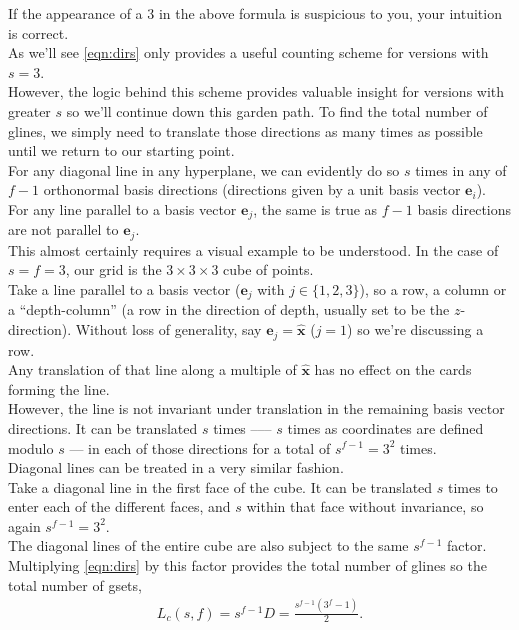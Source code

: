 \documentclass{article}
\theoremstyle{definition}
\theoremstyle{remark}
\begin{document}
If the appearance of a 3 in the above formula is suspicious to you, your intuition is correct.\\
As we'll see \autoref{eqn:dirs} only provides a useful counting scheme for versions with $s=3$.\\
However, the logic behind this scheme provides valuable insight for versions with greater $s$ so we'll continue down this garden path.\smallbreak
To find the total number of glines, we simply need to translate those directions as many times as possible until we return to our starting point.\\
For any diagonal line in any hyperplane, we can evidently do so $s$ times in any of $f-1$ orthonormal basis directions (directions given by a unit basis vector $\mathbf{e}_i$).\\
For any line parallel to a basis vector $\mathbf{e}_j$, the same is true as $f-1$ basis directions are not parallel to $\mathbf{e}_j$.\\
This almost certainly requires a visual example to be understood.\smallbreak
In the case of $s=f=3$, our grid is the $3\times3\times3$ cube of points.\\
Take a line parallel to a basis vector ($\mathbf{e}_j$ with $j\in\{1,2,3\}$), so a row, a column or a ``depth-column'' (a row in the direction of depth, usually set to be the $z$-direction). Without loss of generality, say $\mathbf{e}_j=\hat{\mathbf{x}}$ ($j=1$) so we're discussing a row.\\
Any translation of that line along a multiple of $\hat{\mathbf{x}}$ has no effect on the cards forming the line.\\
However, the line is not invariant under translation in the remaining basis vector directions.
It can be translated $s$ times ––– $s$ times as coordinates are defined modulo $s$ --- in each of those directions for a total of $s^{f-1}=3^{2}$ times.\\
Diagonal lines can be treated in a very similar fashion.\\
Take a diagonal line in the first face of the cube. It can be translated $s$ times to enter each of the different faces, and $s$ within that face without invariance, so again $s^{f-1}=3^{2}$.\\
The diagonal lines of the entire cube are also subject to the same $s^{f-1}$ factor.\\
Multiplying \autoref{eqn:dirs} by this factor provides the total number of glines so the total number of gsets,
\begin{align}
    \label{eqn:crude-lines}
    L_c(s,f)=s^{f-1}D=\frac{s^{f-1}(3^f-1)}{2}.
\end{align}
\end{document}

